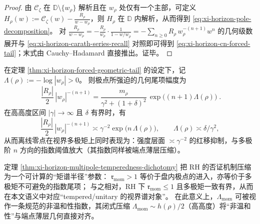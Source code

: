 \begin{proof}
由 \(\mathscr{C}_{\zeta}\) 在 \(\mathbb{D}\setminus\{w_{\rho}\}\) 解析且在 \(w_{\rho}\) 处仅有一个主部，可定义
\(
H_{\rho}(w):=\mathscr{C}_{\zeta}(w)-\frac{R_{\rho}}{w-w_{\rho}}
\)，则 \(H_{\rho}\) 在 \(\mathbb{D}\) 内解析，从而得到 \eqref{eq:xi-horizon-pole-decomposition}。
对 \(\frac{R_{\rho}}{w-w_{\rho}}=-\frac{R_{\rho}}{w_{\rho}}\cdot\frac{1}{1-w/w_{\rho}}
=-\sum_{n\ge 0}R_{\rho}\,w_{\rho}^{-(n+1)}w^n\) 的几何级数展开与 \eqref{eq:xi-horizon-carath-series-recall} 对照即可得到 \eqref{eq:xi-horizon-cn-forced-tail}；末式由 Cauchy--Hadamard 直接推出。证毕。
\end{proof}

\begin{corollary}\label{cor:xi-horizon-redshift-growth-threshold}
在定理 \ref{thm:xi-horizon-forced-geometric-tail} 的设定下，记
\(\Lambda(\rho):=-\log|w_{\rho}|>0\)。
则极点所强迫的几何尾项幅度为
\begin{equation}\label{eq:xi-horizon-forced-term-amplitude}
\boxed{\;
\frac{|R_{\rho}|}{2}\,|w_{\rho}|^{-(n+1)}
=\frac{m_{\rho}}{\gamma^{2}+(1+\delta)^{2}}\,
\exp\!\bigl((n+1)\Lambda(\rho)\bigr)\; }.
\end{equation}
在高高度区间 \(|\gamma|\to\infty\) 且 \(\delta\) 有界时，有
\[
\frac{|R_{\rho}|}{2}\,|w_{\rho}|^{-(n+1)}
\asymp
\gamma^{-2}\exp\!\bigl(n\,\Lambda(\rho)\bigr),
\qquad
\Lambda(\rho)\asymp \delta/\gamma^{2},
\]
从而离线零点在视界多极矩上同时表现为：强度层面 \(\asymp\gamma^{-2}\) 的红移抑制，与多极阶 \(n\) 方向的指数阈值放大（其指数同样被端点薄层压缩）。
\end{corollary}

\begin{remark}\label{rem:xi-horizon-nontempered-parameter-semantics}
定理 \ref{thm:xi-horizon-multipole-temperedness-dichotomy} 把 RH 的否证机制压缩为一个可计算的“矩谱半径”参数：
\(\mathfrak{r}_{\mathrm{mom}}>1\) 等价于盘内极点的进入，亦等价于多极矩不可避免的指数尾项；
与之相对，RH 下 \(\mathfrak{r}_{\mathrm{mom}}\le 1\) 且多极矩一致有界，从而在本文语义中对应“tempered/unitary 的视界谱对象”。
在此意义上，\(\Lambda_{\mathrm{mom}}\) 可被视作一条规范的非温和性指数，其闭式压缩 \(\Lambda_{\mathrm{mom}}\sim h(\rho)/2\)（高高度）将“非温和性”与端点薄层几何直接对齐。
\end{remark}

\endinput





